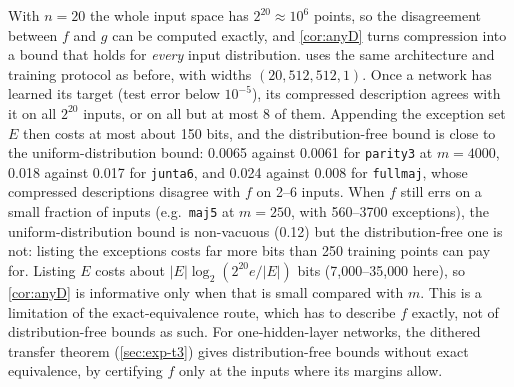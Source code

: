 With $n=20$ the whole input space has $2^{20}\approx10^6$ points, so the disagreement between $f$ and $g$ can be computed exactly, and \cref{cor:anyD} turns compression into a bound that holds for \emph{every} input distribution.  uses the same architecture and training protocol as before, with widths $(20,512,512,1)$. Once a network has learned its target (test error below $10^{-5}$), its compressed description agrees with it on all $2^{20}$ inputs, or on all but at most 8 of them. Appending the exception set $E$ then costs at most about 150 bits, and the distribution-free bound is close to the uniform-distribution bound: 0.0065 against 0.0061 for \texttt{parity3} at $m=4000$, 0.018 against 0.017 for \texttt{junta6}, and 0.024 against 0.008 for \texttt{fullmaj}, whose compressed descriptions disagree with $f$ on 2--6 inputs. When $f$ still errs on a small fraction of inputs (e.g.\ \texttt{maj5} at $m=250$, with 560--3700 exceptions), the uniform-distribution bound is non-vacuous (0.12) but the distribution-free one is not: listing the exceptions costs far more bits than 250 training points can pay for. Listing $E$ costs about $|E|\log_2(2^{20}e/|E|)$ bits (7{,}000--35{,}000 here), so \cref{cor:anyD} is informative only when that is small compared with $m$. This is a limitation of the exact-equivalence route, which has to describe $f$ exactly, not of distribution-free bounds as such. For one-hidden-layer networks, the dithered transfer theorem (\cref{sec:exp-t3}) gives distribution-free bounds without exact equivalence, by certifying $f$ only at the inputs where its margins allow.


